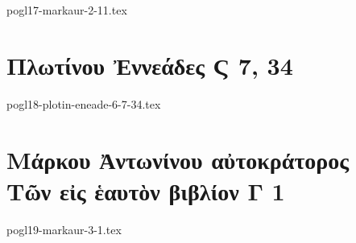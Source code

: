 \documentclass[a4paper,12pt,twoside]{report}
\begin{document}
{pogl17-markaur-2-11.tex}

\chapter[Πλωτίνου Ἐννεάδες Ϛ]{\textgreek[variant=ancient]{Πλωτίνου Ἐννεάδες Ϛ} 7, 34}

{pogl18-plotin-eneade-6-7-34.tex}

\chapter[Μάρκου Ἀντωνίνου Τῶν εἰς ἑαυτὸν Γ]{\textgreek[variant=ancient]{Μάρκου Ἀντωνίνου αὐτοκράτορος \\Τῶν εἰς ἑαυτὸν βιβλίον Γ} 1}

{pogl19-markaur-3-1.tex}
\end{document}
